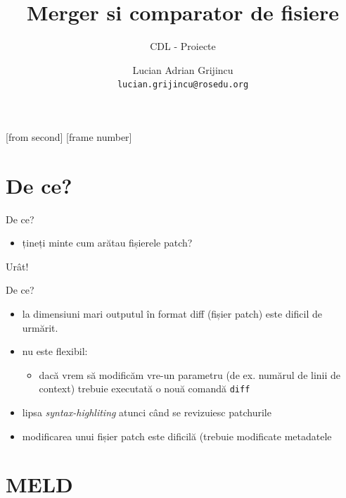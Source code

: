 \documentclass{beamer}
\title[Merger si comparator de fișiere]{Merger si comparator de fisiere}
\subtitle{CDL - Proiecte}
\institute{ROSEdu}
\author{Lucian Adrian Grijincu \\ \texttt{lucian.grijincu@rosedu.org}}
\begin{document}
[from second]
[frame number]

\frame{\titlepage}

\frame{\tableofcontents}






\section{De ce?}
\frame{\tableofcontents[currentsection]}

\begin{frame}{De ce?}
  \begin{itemize}
  \item țineți minte cum arătau fișierele patch?
  \end{itemize}
\end{frame}

\begin{frame}{Urât!}
  
\end{frame}

\begin{frame}{De ce?}
  \begin{itemize}[<+->]
  \item la dimensiuni mari outputul în format diff (fișier patch) este dificil de urmărit.
  \item nu este flexibil: 
    \begin{itemize}
    \item dacă vrem să modificăm vre-un parametru (de ex. numărul de linii de context) trebuie executată o nouă comandă \texttt{diff}
    \end{itemize}
  \item lipsa \textit{syntax-highliting} atunci când se revizuiesc patchurile
  \item modificarea unui fișier patch este dificilă (trebuie modificate metadatele
  \end{itemize}
\end{frame}













\section{MELD}
\frame{\tableofcontents[currentsection]}
\end{document}

